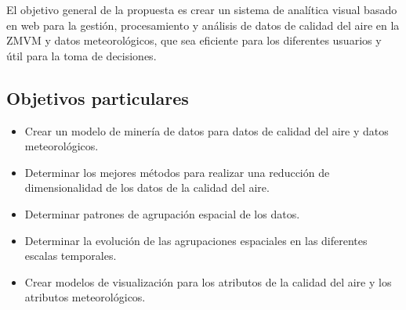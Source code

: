 El objetivo general de la propuesta es crear un sistema de analítica visual basado en web para la gestión, procesamiento y análisis de datos de calidad del aire en la ZMVM y datos meteorológicos, que sea eficiente para los diferentes usuarios y útil para la toma de decisiones.

\subsection{Objetivos particulares}

\begin{itemize}
    \item Crear un modelo de minería de datos para datos de calidad del aire y datos meteorológicos.
    \item Determinar los mejores métodos para realizar una reducción de dimensionalidad de los datos de la calidad del aire.
    \item Determinar patrones de agrupación espacial de los datos.
    \item Determinar la evolución de las agrupaciones espaciales en las diferentes escalas temporales.
    \item Crear modelos de visualización para los atributos de la calidad del aire y los atributos meteorológicos.
\end{itemize}